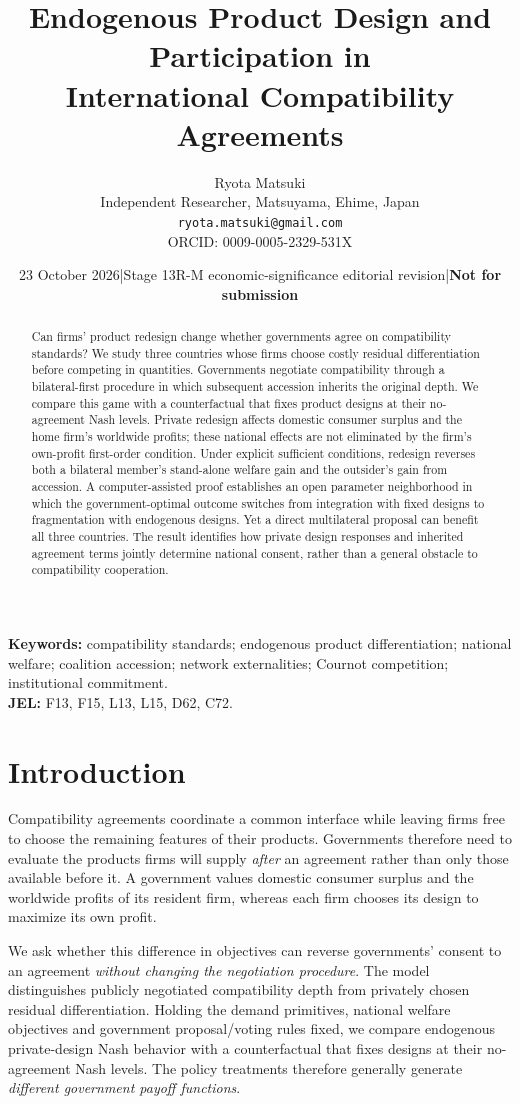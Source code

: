 \documentclass[11pt,a4paper]{article}
\title{Endogenous Product Design and Participation in\\ International Compatibility Agreements}
\author{Ryota Matsuki\\Independent Researcher, Matsuyama, Ehime, Japan\\\texttt{ryota.matsuki@gmail.com}\\ORCID: 0009-0005-2329-531X}
\date{23 October 2026\quad |\quad Stage 13R-M economic-significance editorial revision\quad |\quad \textbf{Not for submission}}
\theoremstyle{remark}\newtheorem{remark}[theorem]{Remark}
\begin{document}
\maketitle
\begin{abstract}
Can firms' product redesign change whether governments agree on compatibility standards? We study three countries whose firms choose costly residual differentiation before competing in quantities. Governments negotiate compatibility through a bilateral-first procedure in which subsequent accession inherits the original depth. We compare this game with a counterfactual that fixes product designs at their no-agreement Nash levels. Private redesign affects domestic consumer surplus and the home firm's worldwide profits; these national effects are not eliminated by the firm's own-profit first-order condition. Under explicit sufficient conditions, redesign reverses both a bilateral member's stand-alone welfare gain and the outsider's gain from accession. A computer-assisted proof establishes an open parameter neighborhood in which the government-optimal outcome switches from integration with fixed designs to fragmentation with endogenous designs. Yet a direct multilateral proposal can benefit all three countries. The result identifies how private design responses and inherited agreement terms jointly determine national consent, rather than a general obstacle to compatibility cooperation.
\end{abstract}
\noindent\textbf{Keywords:} compatibility standards; endogenous product differentiation; national welfare; coalition accession; network externalities; Cournot competition; institutional commitment.\\
\textbf{JEL:} F13, F15, L13, L15, D62, C72.

\section{Introduction}

Compatibility agreements coordinate a common interface while leaving firms free to choose the remaining features of their products. Governments therefore need to evaluate the products firms will supply \emph{after} an agreement rather than only those available before it. A government values domestic consumer surplus and the worldwide profits of its resident firm, whereas each firm chooses its design to maximize its own profit.

We ask whether this difference in objectives can reverse governments' consent to an agreement \emph{without changing the negotiation procedure}. The model distinguishes publicly negotiated compatibility depth from privately chosen residual differentiation. Holding the demand primitives, national welfare objectives and government proposal/voting rules fixed, we compare endogenous private-design Nash behavior with a counterfactual that fixes designs at their no-agreement Nash levels. The policy treatments therefore generally generate \emph{different government payoff functions}.
\end{document}
